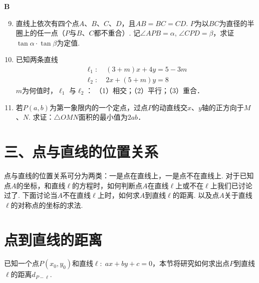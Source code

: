 \begin{center}
    \bfseries B
\end{center}

\begin{enumerate}\setcounter{enumi}{8}
    \item  直线上依次有四个点$A$、$B$、$C$、$D$，且$AB=BC=CD$. $P$为以$BC$为直径的半圈上的任一点（$P$与$B$、$C$都不重合）. 记$\angle APB=\alpha$, $\angle CPD=\beta$，求证$\tan\alpha\cdot \tan\beta$为定值.
    \item 已知两条直线
\[\begin{split}
     \ell_1:&\; (3+m)x+4y=5-3m\\
    \ell_2:&\; 2x+(5+m)y=8   
\end{split}\]
$m$为何值时，$\ell_1$
    与$\ell_2$：
    （1）相交；（2）平行；（3）重合．
    \item 若$P(a,b)$为第一象限内的一个定点，过点$P$的动直线交$x$、$y$轴的正方向于$M$、$N$. 求证：$\triangle OMN$面积的最小值为$2ab$．
\end{enumerate}

\section*{三、点与直线的位置关系}
点与直线的位置关系可分为两类：一是点在直线上，一是点不在直线上. 对于已知点$A$的坐标，和直线$\ell$的方程时，如何判断点$A$在直线$\ell$上或不在$\ell$上我们已讨论过了. 下面讨论当$A$不在直线$\ell$上时，如何求$A$到直线$\ell$的距离. 以及点$A$关于直线$\ell$的对称点的坐标的求法.

\section{点到直线的距离}
已知一个点$P(x_0,y_0)$和直线$\ell:\; ax+by+c=0$，本节将研究如何求出点$P$到直线$\ell$的距离$d_{P-\ell}$.

